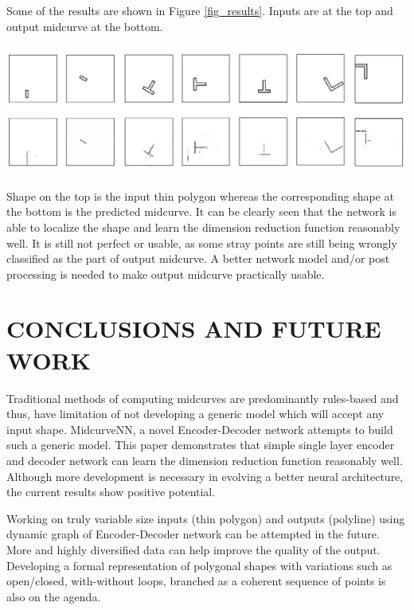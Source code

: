\documentclass[9pt,academicons]{article}
\begin{document}
Some of the results are shown in Figure \ref{fig_results}. Inputs are at the top and output midcurve at the bottom.

     \begin{center}
	\includegraphics[width=\linewidth]{images/midcurvenn_results}
	\label{fig_results}
    \end{center}

Shape on the top is the input thin polygon whereas the corresponding shape at the bottom is the predicted midcurve. It can be clearly seen that the network is able to localize the shape and learn the dimension reduction function reasonably well. It is still not perfect or usable, as some stray points are still being wrongly classified as the part of output midcurve. A better network model and/or post processing is needed to make output midcurve practically usable.


\section{CONCLUSIONS AND FUTURE WORK}

Traditional methods of computing midcurves are predominantly rules-based and thus, have limitation of not developing a generic model which will accept any input shape. MidcurveNN, a novel Encoder-Decoder network attempts to build such a generic model. This paper demonstrates that simple single layer encoder and decoder network can learn the dimension reduction function reasonably well. Although more development is necessary in evolving a better neural architecture, the current results show positive potential. 

Working on truly variable size inputs (thin polygon) and outputs (polyline) using dynamic graph of Encoder-Decoder network can be attempted in the future. More and highly diversified data can help improve the quality of the output. Developing a formal representation of polygonal shapes with variations such as open/closed, with-without loops, branched as a coherent sequence of points is also on the agenda.
\end{document}
